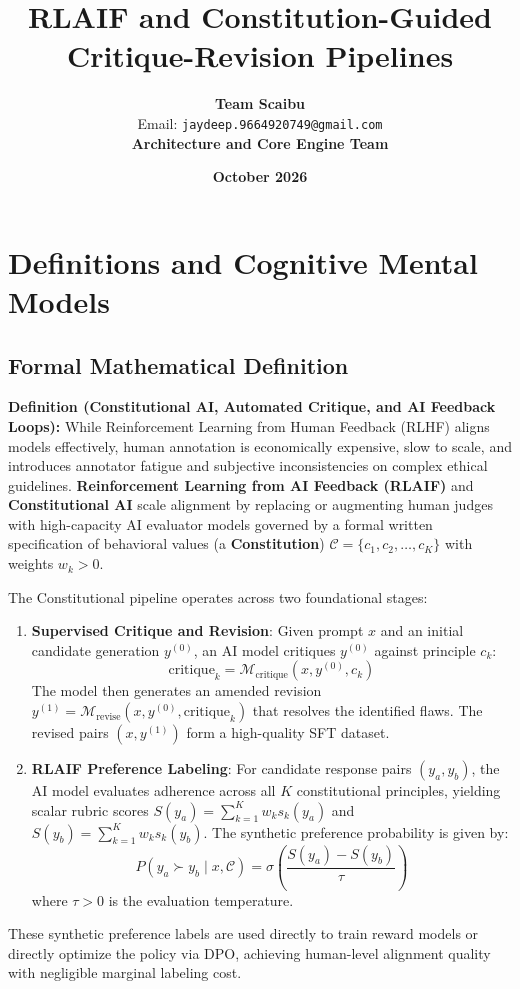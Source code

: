\documentclass[11pt,a4paper]{article}
\title{\textbf{RLAIF and Constitution-Guided Critique-Revision Pipelines}}
\author{\textbf{Team Scaibu} \\ \small Email: \texttt{jaydeep.9664920749@gmail.com} \\ \small \textbf{Architecture and Core Engine Team}}
\date{\textbf{October 2026}}
\theoremstyle{definition}
\begin{document}
\maketitle

\section{Definitions and Cognitive Mental Models}

\subsection{Formal Mathematical Definition}
\textbf{Definition (Constitutional AI, Automated Critique, and AI Feedback Loops):}
While Reinforcement Learning from Human Feedback (RLHF) aligns models effectively, human annotation is economically expensive, slow to scale, and introduces annotator fatigue and subjective inconsistencies on complex ethical guidelines. \textbf{Reinforcement Learning from AI Feedback (RLAIF)} and \textbf{Constitutional AI} scale alignment by replacing or augmenting human judges with high-capacity AI evaluator models governed by a formal written specification of behavioral values (a \textbf{Constitution}) $\mathcal{C} = \{c_1, c_2, \dots, c_K\}$ with weights $w_k > 0$.

The Constitutional pipeline operates across two foundational stages:
\begin{enumerate}
    \item \textbf{Supervised Critique and Revision}: Given prompt $x$ and an initial candidate generation $y^{(0)}$, an AI model critiques $y^{(0)}$ against principle $c_k$:
    {\boldmath
    \begin{equation}
    \text{critique}_k = \mathcal{M}_{\text{critique}}(x, y^{(0)}, c_k)
    \end{equation}
    }
    The model then generates an amended revision $y^{(1)} = \mathcal{M}_{\text{revise}}(x, y^{(0)}, \text{critique}_k)$ that resolves the identified flaws. The revised pairs $(x, y^{(1)})$ form a high-quality SFT dataset.
    \item \textbf{RLAIF Preference Labeling}: For candidate response pairs $(y_a, y_b)$, the AI model evaluates adherence across all $K$ constitutional principles, yielding scalar rubric scores $S(y_a) = \sum_{k=1}^K w_k s_k(y_a)$ and $S(y_b) = \sum_{k=1}^K w_k s_k(y_b)$. The synthetic preference probability is given by:
    {\boldmath
    \begin{equation}
    P(y_a \succ y_b \mid x, \mathcal{C}) = \sigma\left( \frac{S(y_a) - S(y_b)}{\tau} \right)
    \end{equation}
    }
    where $\tau > 0$ is the evaluation temperature.
\end{enumerate}
These synthetic preference labels are used directly to train reward models or directly optimize the policy via DPO, achieving human-level alignment quality with negligible marginal labeling cost.
\end{document}
